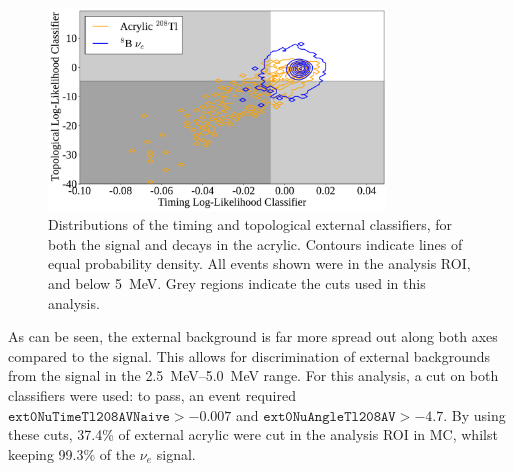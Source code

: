 \begin{figure}
    \centering
    \includegraphics[width=0.8\textwidth]{6_SolarAnalysis/images/externals_tagging_eff.pdf}
    \caption[Distributions of the two external classifiers, for both the \beight{} signal and  decays in the acrylic]
    {Distributions of the timing and topological external classifiers, for both the \beight{} signal and  decays in the acrylic. Contours indicate lines of equal probability density. All events shown were in the analysis ROI, and below \SI{5}{\MeV}. Grey regions indicate the cuts used in this analysis.}
    \label{fig:external_classifier_corr}
\end{figure}

As can be seen, the external background is far more spread out along both axes compared to the signal. This allows for discrimination of external backgrounds from the signal in the \SIrange{2.5}{5.0}{\MeV} range. For this analysis, a cut on both classifiers were used: to pass, an event required $\mathtt{ext0NuTimeTl208AVNaive} > -0.007$ and $\mathtt{ext0NuAngleTl208AV} > -4.7$. By using these cuts, 37.4\% of external acrylic  were cut in the analysis ROI in MC, whilst keeping 99.3\% of the \beight{} $\nu_{e}$ signal.

%

